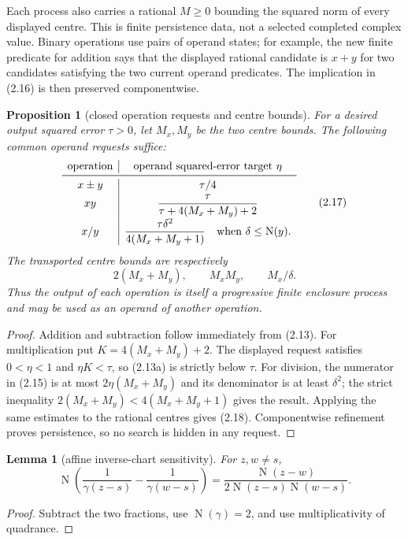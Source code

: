 \documentclass[10pt]{article}
\newtheorem{lemma}[theorem]{Lemma}
\newtheorem{proposition}[theorem]{Proposition}
\theoremstyle{definition}
\theoremstyle{remark}
\newcommand{\Norm}{\operatorname{N}}
\begin{document}
Each process also carries a rational $M\ge0$ bounding the squared norm of every
displayed centre.  This is finite persistence data, not a selected completed
complex value.  Binary operations use pairs of operand states; for example,
the new finite predicate for addition says that the displayed rational
candidate is $x+y$ for two candidates satisfying the two current operand
predicates.  The implication in (2.16) is then preserved componentwise.

\begin{proposition}[closed operation requests and centre bounds]
For a desired output squared error $\tau>0$, let $M_x,M_y$ be the two centre
bounds.  The following common operand requests suffice:
\[
\begin{array}{c|c}
\text{operation}&\text{operand squared-error target }\eta\\ \midrule
x\mathbin{\pm}y&\tau/4\\[2pt]
xy&\displaystyle
 \frac{\tau}{\tau+4(M_x+M_y)+2}\\[7pt]
x/y&\displaystyle
 \frac{\tau\delta^2}{4(M_x+M_y+1)}
 \quad\text{when }\delta\le\Norm(y).
\end{array}
\tag{2.17}
\]
The transported centre bounds are respectively
\[
 2(M_x+M_y),\qquad M_xM_y,\qquad M_x/\delta.
\tag{2.18}
\]
Thus the output of each operation is itself a progressive finite enclosure
process and may be used as an operand of another operation.
\end{proposition}

\begin{proof}
Addition and subtraction follow immediately from (2.13).  For
multiplication put $K=4(M_x+M_y)+2$.  The displayed request satisfies
$0<\eta<1$ and $\eta K<\tau$, so (2.13a) is strictly below $\tau$.
For division, the numerator in (2.15) is at most
$2\eta(M_x+M_y)$ and its denominator is at least $\delta^2$; the strict
inequality $2(M_x+M_y)<4(M_x+M_y+1)$ gives the result.  Applying the same
estimates to the rational centres gives (2.18).  Componentwise refinement
proves persistence, so no search is hidden in any request.
\end{proof}

\begin{lemma}[affine inverse-chart sensitivity]
For $z,w\ne s$,
\[
 \Norm\!\left(
 \frac1{\gamma(z-s)}-\frac1{\gamma(w-s)}\right)
 =\frac{\Norm(z-w)}
 {2\Norm(z-s)\Norm(w-s)}.
\tag{2.19}
\]
\end{lemma}

\begin{proof}
Subtract the two fractions, use $\Norm(\gamma)=2$, and use
multiplicativity of quadrance.
\end{proof}
\end{document}

